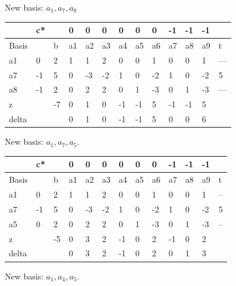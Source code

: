 New basis: $a_1, a_7, a_8$

\begin{table}[H]
\begin{tabular}{|l|l|l|l|l|l|l|l|l|l|l|l|l|}
\hline
      & c* &    & 0  & 0  & 0  & 0  & 0  & 0  & -1 & -1 & -1 &     \\ \hline
Basis &    & b  & a1 & a2 & a3 & a4 & a5 & a6 & a7 & a8 & a9 & t   \\ \hline
a1    & 0  & 2  & 1  & 1  & 2  & 0  & 0  & 1  & 0  & 0  & 1  & --- \\ \hline
a7    & -1 & 5  & 0  & -3 & -2 & 1  & 0  & -2 & 1  & 0  & -2 & 5   \\ \hline
a8    & -1 & 2  & 0  & 2  & 2  & 0  & 1  & -3 & 0  & 1  & -3 & --- \\ \hline
z     &    & -7 & 0  & 1  & 0  & -1 & -1 & 5  & -1 & -1 & 5  &     \\ \hline
delta &    &    & 0  & 1  & 0  & -1 & -1 & 5  & 0  & 0  & 6  &     \\ \hline
\end{tabular}
\end{table}

New basis: $a_1, a_7, a_5$.
\begin{table}[H]
\begin{tabular}{|l|l|l|l|l|l|l|l|l|l|l|l|l|}
\hline
      & c* &    & 0  & 0  & 0  & 0  & 0  & 0  & -1 & -1 & -1 &    \\ \hline
Basis &    & b  & a1 & a2 & a3 & a4 & a5 & a6 & a7 & a8 & a9 & t  \\ \hline
a1    & 0  & 2  & 1  & 1  & 2  & 0  & 0  & 1  & 0  & 0  & 1  & -- \\ \hline
a7    & -1 & 5  & 0  & -3 & -2 & 1  & 0  & -2 & 1  & 0  & -2 & 5  \\ \hline
a5    & 0  & 2  & 0  & 2  & 2  & 0  & 1  & -3 & 0  & 1  & -3 & -- \\ \hline
z     &    & -5 & 0  & 3  & 2  & -1 & 0  & 2  & -1 & 0  & 2  &    \\ \hline
delta &    &    & 0  & 3  & 2  & -1 & 0  & 2  & 0  & 1  & 3  &    \\ \hline
\end{tabular}
\end{table}

New basis: $a_1, a_4, a_5$.

